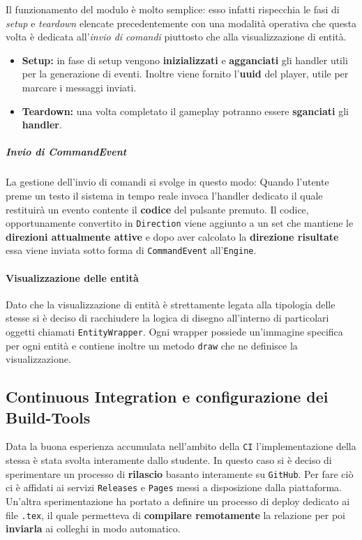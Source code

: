 

Il funzionamento del modulo è molto semplice: esso infatti rispecchia le fasi di \textit{setup} e \textit{teardown} elencate precedentemente con una modalità operativa che questa volta è dedicata all'\textit{invio di comandi} piuttosto che alla visualizzazione di entità.
\begin{itemize}
	\item{\textbf{Setup:}} in fase di setup vengono \textbf{inizializzati} e \textbf{agganciati} gli handler utili per la generazione di eventi. Inoltre viene fornito l'\textbf{uuid} del player, utile per marcare i messaggi inviati.
	\item{\textbf{Teardown:}} una volta completato il gameplay potranno essere \textbf{sganciati} gli \textbf{handler}.
\end{itemize}

\subparagraph{Invio di CommandEvent}
La gestione dell'invio di comandi si svolge in questo modo:
Quando l'utente preme un testo il sistema in tempo reale invoca l'handler dedicato il quale restituirà un evento contente il \textbf{codice} del pulsante premuto. Il codice, opportunamente convertito in \texttt{Direction} viene aggiunto a un set che mantiene le \textbf{direzioni attualmente attive} e dopo aver calcolato la \textbf{direzione risultate} essa viene inviata sotto forma di \texttt{CommandEvent} all'\texttt{Engine}.

\paragraph{Visualizzazione delle entità}
Dato che la visualizzazione di entità è strettamente legata alla tipologia delle stesse si è deciso di racchiudere la logica di disegno all'interno di particolari oggetti chiamati \texttt{EntityWrapper}. Ogni wrapper possiede un'immagine specifica per ogni entità e contiene inoltre un metodo \texttt{draw} che ne definisce la visualizzazione.

\subsection{Continuous Integration e configurazione dei Build-Tools}
\label{subsubsec:ci}
Data la buona esperienza accumulata nell'ambito della \texttt{CI} l'implementazione della stessa è stata svolta interamente dallo studente. In questo caso si è deciso di sperimentare un processo di \textbf{rilascio} basanto interamente su \texttt{GitHub}. Per fare ciò ci è affidati ai servizi \texttt{Releases} e \texttt{Pages} messi a disposizione dalla piattaforma. Un'altra sperimentazione ha portato a definire un processo di deploy dedicato ai file \texttt{.tex}, il quale permetteva di \textbf{compilare remotamente} la relazione per poi \textbf{inviarla} ai colleghi in modo automatico.

